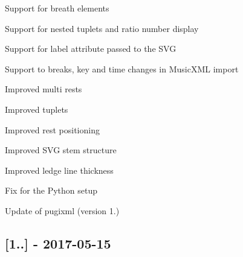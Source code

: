 \begin{DoxyItemize}
\item Support for breath elements
\item Support for nested tuplets and ratio number display
\item Support for label attribute passed to the S\+VG
\item Support to breaks, key and time changes in Music\+X\+ML import
\item Improved multi rests
\item Improved tuplets
\item Improved rest positioning
\item Improved S\+VG stem structure
\item Improved ledge line thickness
\item Fix for the Python setup
\item Update of pugixml (version 1.)
\end{DoxyItemize}

\subsection*{\mbox{[}1..\mbox{]} -\/ 2017-\/05-\/15}


